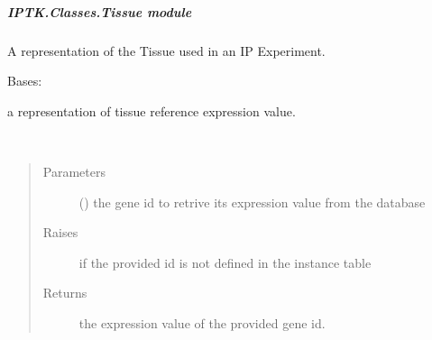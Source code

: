 \documentclass[letterpaper,10pt,english]{sphinxmanual}
\begin{document}
\subparagraph{IPTK.Classes.Tissue module}
\label{\detokenize{IPTK.Classes:module-IPTK.Classes.Tissue}}\label{\detokenize{IPTK.Classes:iptk-classes-tissue-module}}
A representation of the Tissue used in an IP Experiment.

\begin{fulllineitems}
\label{\detokenize{IPTK.Classes:IPTK.Classes.Tissue.ExpressionProfile}}
Bases: 

a representation of tissue reference expression value.

\begin{fulllineitems}
\label{\detokenize{IPTK.Classes:IPTK.Classes.Tissue.ExpressionProfile.get_gene_id_expression}}~\begin{quote}\begin{description}
\item[{Parameters}] \leavevmode
{} () \textendash{} the gene id to retrive its expression value from the database

\item[{Raises}] \leavevmode
{} \textendash{} if the provided id is not defined in the instance table

\item[{Returns}] \leavevmode
the expression value of the provided gene id.


\end{description}
\end{quote}
\end{fulllineitems}
\end{fulllineitems}
\end{document}
